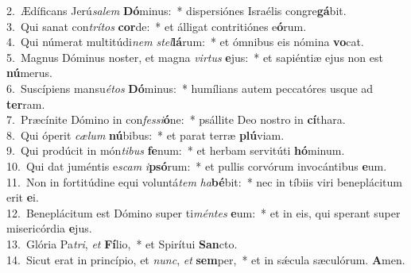 {2.~}Ædíficans Jerú\textit{sa}\textit{lem} \textbf{Dó}minus:~* dispersiónes Israélis congre\textbf{gá}bit.\\
{3.~}Qui sanat con\textit{trí}\textit{tos} \textbf{cor}de:~* et álligat contritiónes e\textbf{ó}rum.\\
{4.~}Qui númerat multitúdi\textit{nem} \textit{stel}\textbf{lá}rum:~* et ómnibus eis nómina \textbf{vo}cat.\\
{5.~}Magnus Dóminus noster, et magna \textit{vir}\textit{tus} \textbf{e}jus:~* et sapiéntiæ ejus non est \textbf{nú}merus.\\
{6.~}Suscípiens mansu\textit{é}\textit{tos} \textbf{Dó}minus:~* humílians autem peccatóres usque ad \textbf{ter}ram.\\
{7.~}Præcínite Dómino in con\textit{fes}\textit{si}\textbf{ó}ne:~* psállite Deo nostro in \textbf{cí}thara.\\
{8.~}Qui óperit \textit{cæ}\textit{lum} \textbf{nú}bibus:~* et parat terræ \textbf{plú}viam.\\
{9.~}Qui prodúcit in món\textit{ti}\textit{bus} \textbf{fe}num:~* et herbam servitúti \textbf{hó}minum.\\
{10.~}Qui dat juméntis e\textit{scam} \textit{i}\textbf{psó}rum:~* et pullis corvórum invocántibus \textbf{e}um.\\
{11.~}Non in fortitúdine equi voluntá\textit{tem} \textit{ha}\textbf{bé}bit:~* nec in tíbiis viri beneplácitum erit \textbf{e}i.\\
{12.~}Beneplácitum est Dómino super ti\textit{mén}\textit{tes} \textbf{e}um:~* et in eis, qui sperant super misericórdia \textbf{e}jus.\\
{13.~}Glória Pa\textit{tri}, \textit{et} \textbf{Fí}lio,~* et Spirítui \textbf{San}cto.\\
{14.~}Sicut erat in princípio, et \textit{nunc}, \textit{et} \textbf{sem}per,~* et in sǽcula sæculórum. \textbf{A}men.\\

